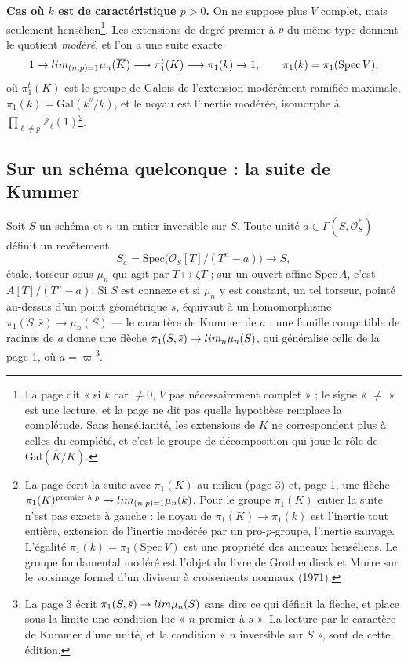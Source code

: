 \documentclass[11pt,a4paper]{article}
\begin{document}
\textbf{Cas où $k$ est de caractéristique $p > 0$.} On ne suppose plus $V$
complet, mais seulement hensélien\footnote{La page dit « si $k$ car $\neq 0$,
$V$ pas nécessairement complet » ; le signe « $\neq$ » est une lecture, et la
page ne dit pas quelle hypothèse remplace la complétude. Sans hensélianité,
les extensions de $K$ ne correspondent plus à celles du complété, et c'est le
groupe de décomposition qui joue le rôle de $\mathrm{Gal}(\overline{K}/K)$.}.
Les extensions de degré premier à $p$ du même type donnent le quotient
\emph{modéré}, et l'on a une suite exacte
\[
1 \to \varprojlim_{(n, p) = 1} \mu_n(\overline{K}) \longrightarrow \pi_1^{t}(K)
\longrightarrow \pi_1(k) \to 1, \qquad \pi_1(k) = \pi_1(\mathrm{Spec}\, V),
\]
où $\pi_1^{t}(K)$ est le groupe de Galois de l'extension modérément ramifiée
maximale, $\pi_1(k) = \mathrm{Gal}(k^{s}/k)$, et le noyau est l'inertie modérée,
isomorphe à $\prod_{\ell \neq p} \mathbb{Z}_\ell(1)$\footnote{La page écrit la
suite avec $\pi_1(K)$ au milieu (page 3) et, page 1, une flèche
$\pi_1(K)^{\text{premier à } p} \to \varprojlim_{(n,p)=1} \mu_n(k)$. Pour le
groupe $\pi_1(K)$ entier la suite n'est pas exacte à gauche : le noyau de
$\pi_1(K) \to \pi_1(k)$ est l'inertie tout entière, extension de l'inertie modérée
par un pro-$p$-groupe, l'inertie sauvage. L'égalité
$\pi_1(k) = \pi_1(\mathrm{Spec}\, V)$ est une propriété des anneaux henséliens. Le
groupe fondamental modéré est l'objet du livre de Grothendieck et Murre sur le
voisinage formel d'un diviseur à croisements normaux (1971).}.

\subsection*{Sur un schéma quelconque : la suite de Kummer}

Soit $S$ un schéma et $n$ un entier inversible sur $S$. Toute unité
$a \in \Gamma(S, \mathcal{O}_S^{*})$ définit un revêtement
\[
S_a = \mathrm{Spec}\bigl(\mathcal{O}_S[T]/(T^n - a)\bigr) \longrightarrow S,
\]
étale, torseur sous $\mu_n$ qui agit par $T \mapsto \zeta T$ ; sur un ouvert
affine $\mathrm{Spec}\, A$, c'est $A[T]/(T^n - a)$. Si $S$ est connexe et si
$\mu_n$ y est constant, un tel torseur, pointé au-dessus d'un point géométrique
$\bar{s}$, équivaut à un homomorphisme $\pi_1(S, \bar{s}) \to \mu_n(S)$ — le
caractère de Kummer de $a$ ; une famille compatible de racines de $a$ donne
une flèche $\pi_1(S, \bar{s}) \to \varprojlim_n \mu_n(S)$, qui généralise celle de
la page 1, où $a = \varpi$\footnote{La page 3 écrit
$\pi_1(S, \bar{s}) \to \varprojlim \mu_n(S)$ sans dire ce qui définit la flèche,
et place sous la limite une condition lue « $n$ premier à $s$ ». La lecture par
le caractère de Kummer d'une unité, et la condition « $n$ inversible sur $S$ »,
sont de cette édition.}.
\end{document}
